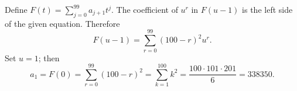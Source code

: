 Define $F(t)=\sum_{j=0}^{99}a_{j+1}t^j$. The coefficient of $u^r$ in $F(u-1)$ is the left side of the given equation. Therefore
\[
F(u-1)=\sum_{r=0}^{99}(100-r)^2u^r.
\]
Set $u=1$; then
\[
a_1=F(0)=\sum_{r=0}^{99}(100-r)^2
=\sum_{k=1}^{100}k^2
=\dfrac{100\cdot101\cdot201}{6}
=\boxed{338350}.
\]
